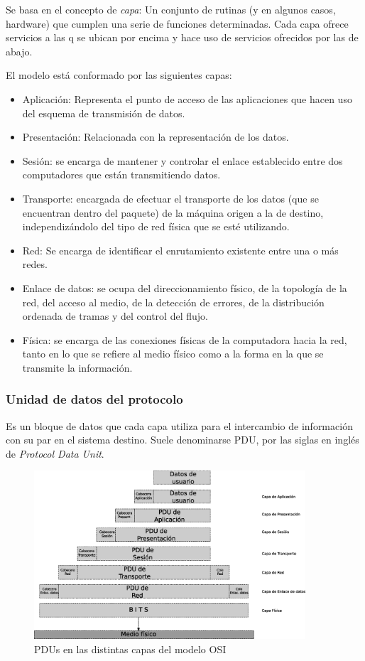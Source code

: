 Se basa en el concepto de \textit{capa}: Un conjunto de rutinas (y en algunos casos, hardware) que cumplen una serie de funciones determinadas. Cada capa ofrece servicios a las q se ubican por encima y hace uso de servicios ofrecidos por las de abajo. 



El modelo está conformado por las siguientes capas:

\begin{itemize}
	\item Aplicación: Representa el punto de acceso de las aplicaciones que hacen uso del esquema de transmisión de datos.
	\item Presentación: Relacionada con la representación de los datos.
	\item Sesión: se encarga de mantener y controlar el enlace establecido entre dos computadores que están transmitiendo datos.
	\item Transporte: encargada de efectuar el transporte de los datos (que se encuentran dentro del paquete) de la máquina origen a la de destino, independizándolo del tipo de red física que se esté utilizando.
	\item Red: Se encarga de identificar el enrutamiento existente entre una o más redes.
	\item Enlace de datos: se ocupa del direccionamiento físico, de la topología de la red, del acceso al medio, de la detección de errores, de la distribución ordenada de tramas y del control del flujo.
	\item Física: se encarga de las conexiones físicas de la computadora hacia la red, tanto en lo que se refiere al medio físico como a la forma en la que se transmite la información.
\end{itemize}

\subsubsection{Unidad de datos del protocolo}

Es un bloque de datos que cada capa utiliza para el intercambio de información con su par en el sistema destino. Suele denominarse PDU, por las siglas en inglés de \textit{Protocol Data Unit}.

\begin{figure}[h]
  \centering
	\includegraphics[width=0.90\textwidth]{2-sistema/graf/pdu.eps}
  \caption{PDUs en las distintas capas del modelo OSI}
  \label{fig:pdu}
\end{figure}

